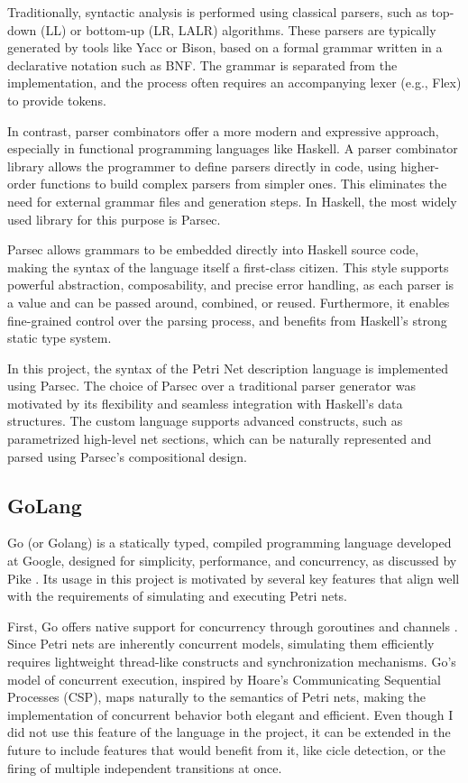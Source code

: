\documentclass[12pt]{article}
\begin{document}
        Traditionally, syntactic analysis is performed using classical parsers, such as top-down (LL) or bottom-up (LR, LALR) algorithms. These parsers are typically generated by tools like Yacc or Bison, based on a formal grammar written in a declarative notation such as BNF. The grammar is separated from the implementation, and the process often requires an accompanying lexer (e.g., Flex) to provide tokens.
        \cite{alfred2007compilers}

        In contrast, parser combinators offer a more modern and expressive approach, especially in functional programming languages like Haskell. A parser combinator library allows the programmer to define parsers directly in code, using higher-order functions to build complex parsers from simpler ones. This eliminates the need for external grammar files and generation steps. In Haskell, the most widely used library for this purpose is Parsec.
        
        Parsec allows grammars to be embedded directly into Haskell source code, making the syntax of the language itself a first-class citizen. This style supports powerful abstraction, composability, and precise error handling, as each parser is a value and can be passed around, combined, or reused. Furthermore, it enables fine-grained control over the parsing process, and benefits from Haskell’s strong static type system.
        
        In this project, the syntax of the Petri Net description language is implemented using Parsec. The choice of Parsec over a traditional parser generator was motivated by its flexibility and seamless integration with Haskell’s data structures. The custom language supports advanced constructs, such as parametrized high-level net sections, which can be naturally represented and parsed using Parsec’s compositional design.
        
    \subsection{GoLang}
    Go (or Golang) is a statically typed, compiled programming language developed at Google, designed for simplicity, performance, and concurrency, as discussed by Pike \cite{pike2012go}. Its usage in this project is motivated by several key features that align well with the requirements of simulating and executing Petri nets.

    First, Go offers native support for concurrency through goroutines and channels \cite{pike2012go}. Since Petri nets are inherently concurrent models, simulating them efficiently requires lightweight thread-like constructs and synchronization mechanisms. Go’s model of concurrent execution, inspired by Hoare’s Communicating Sequential Processes (CSP), maps naturally to the semantics of Petri nets, making the implementation of concurrent behavior both elegant and efficient.
    Even though I did not use this feature of the language in the project, it can be extended in the future to include features that would benefit from it, like cicle detection, or the firing of multiple independent transitions at once.
\end{document}
